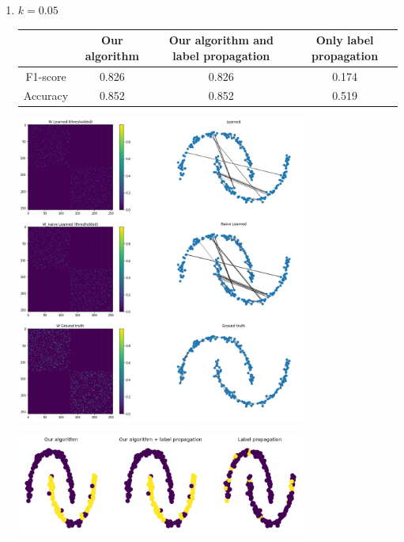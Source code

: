 \documentclass[a4paper]{article}
\begin{document}
\begin{enumerate}
    \item $k = 0.05$
        \begin{center}
            \begin{tabular}{|c|c|c|c|}
                \hline
                    & Our algorithm & Our algorithm and label propagation & Only label propagation\\
                \hline
                F1-score & 0.826 & 0.826 & 0.174 \\
                \hline
                Accuracy & 0.852 & 0.852 & 0.519 \\
                \hline
            \end{tabular}
        \end{center}
        \begin{center}
            \includegraphics[width=0.75\textwidth]{images/p2/5_percent_learned_graphs.png}
        \end{center}
        \begin{center}
            \includegraphics[width=0.75\textwidth]{images/p2/5_percent_predicted_labels.png}

\end{center}
\end{enumerate}
\end{document}
